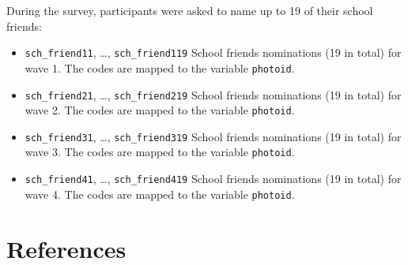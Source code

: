 \documentclass[
]{book}
\begin{document}
During the survey, participants were asked to name up to 19 of their school
friends:

\begin{itemize}
\item
  \texttt{sch\_friend11}, \ldots, \texttt{sch\_friend119} School friends nominations (19 in total)
  for wave 1. The codes are mapped to the variable \texttt{photoid}.
\item
  \texttt{sch\_friend21}, \ldots, \texttt{sch\_friend219} School friends nominations (19 in total)
  for wave 2. The codes are mapped to the variable \texttt{photoid}.
\item
  \texttt{sch\_friend31}, \ldots, \texttt{sch\_friend319} School friends nominations (19 in total)
  for wave 3. The codes are mapped to the variable \texttt{photoid}.
\item
  \texttt{sch\_friend41}, \ldots, \texttt{sch\_friend419} School friends nominations (19 in total)
  for wave 4. The codes are mapped to the variable \texttt{photoid}.
\end{itemize}



\hypertarget{references}{%
\chapter*{References}\label{references}}
\end{document}
